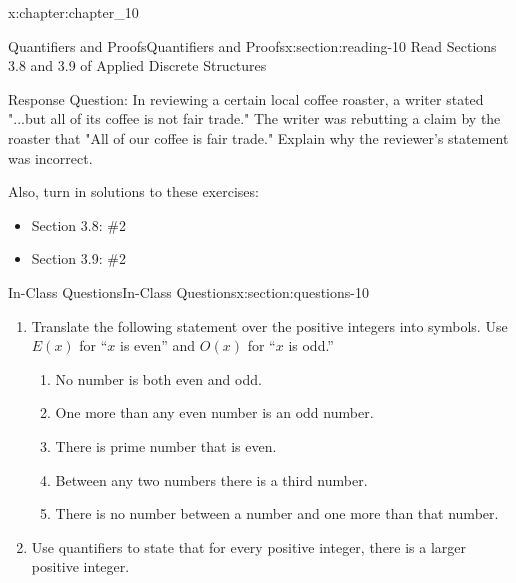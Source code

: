 \documentclass[oneside,10pt,]{book}
\numberwithin{equation}{section}
\begin{document}
%
%
\typeout{************************************************}
\typeout{************************************************}
%
\begin{chapterptx}{}{}{}{}{}{x:chapter:chapter_10}
\index{}%
%
%
\typeout{************************************************}
\typeout{************************************************}
%
\begin{sectionptx}{Quantifiers and Proofs}{}{Quantifiers and Proofs}{}{}{x:section:reading-10}
Read Sections 3.8 and 3.9 of Applied Discrete Structures%
\par
Response Question: In reviewing a certain local coffee roaster, a writer stated  "...but all of its coffee is not fair trade." The writer was rebutting a claim by the roaster that "All of our coffee is fair trade."  Explain why the reviewer's statement was incorrect.%
\par
Also, turn in solutions to these exercises:%
\begin{itemize}[label=\textbullet]
\item{}Section 3.8: \#2%
\item{}Section 3.9: \#2%
\end{itemize}
%
\end{sectionptx}
%
%
\typeout{************************************************}
\typeout{************************************************}
%
\begin{sectionptx}{In-Class Questions}{}{In-Class Questions}{}{}{x:section:questions-10}
%
\begin{enumerate}[label=\arabic*.]
\item{}Translate the following statement over the positive integers into symbols. Use \(E(x)\) for ``\(x\) is even'' and \(O(x)\) for ``\(x\) is odd.''%
\begin{enumerate}[label=(\alph*)]
\item{}No number is both even and odd.%
\item{}One more than any even number is an odd number.%
\item{}There is prime number that is even.%
\item{}Between any two numbers there is a third number.%
\item{}There is no number between a number and one more than that number.%
\end{enumerate}
%
\item{}Use quantifiers to state that for every positive integer, there is a larger positive integer.%

\end{enumerate}
\end{sectionptx}
\end{chapterptx}
\end{document}
